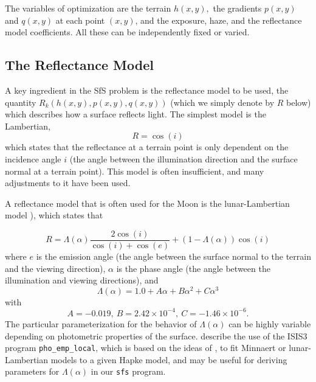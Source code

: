 \documentclass[draft,linenumbers]{agujournal}
\begin{document}
The variables of optimization are the terrain $h(x, y),$ the gradients 
$p(x, y)$ and $q(x, y)$ at each point
$(x, y)$, and the exposure, haze, and the reflectance model coefficients. 
All these can be independently fixed or varied. 

\subsection{The Reflectance Model}
\label{reflectance}

A key ingredient in the SfS problem is the reflectance model to be used, 
the quantity $R_k(h(x, y), p(x, y), q(x,y))$ (which we simply denote by $R$ below)
which describes
how a surface reflects light. The simplest model is the Lambertian,
\begin{equation}
R = \cos(i)
\end{equation}
which states that the reflectance at a terrain point is only dependent
on the incidence angle $i$ (the angle between the illumination
direction and the surface normal at a terrain point). This model is
often insufficient, and many adjustments to it have been used.

A reflectance model that is often used for the Moon is the lunar-Lambertian model
\citep{mcewen1996precise,lohse2006derivation}), which states that

\begin{equation}
R = \Lambda(\alpha) \frac{2\cos (i)}{\cos(i) + \cos(e)}
 + \left(1-\Lambda(\alpha)\right) \cos(i)
\end{equation}
where $e$ is the emission angle (the angle between the surface
normal to the terrain and the viewing direction), $\alpha$ is the phase
angle (the angle between the illumination and viewing directions), and
\begin{equation}
\Lambda(\alpha) = 1.0 + A\alpha + B\alpha^2 + C\alpha^3
\end{equation}
with
\begin{equation}
A = -0.019, \  B = 2.42\times 10^{-4}, \  C = -1.46 \times 10^{-6}.
\end{equation}
The particular parameterization for the behavior of $\Lambda(\alpha)$ can be highly
variable depending on photometric properties of the surface.  \citet{kirk2003photoclinometry}
describe the use of the ISIS3 program \texttt{pho\_emp\_local}, which is based on the ideas of \citet{mcewen1991photometric}, to
fit Minnaert or lunar-Lambertian models to a given Hapke model, and
may be useful for deriving parameters for $\Lambda(\alpha)$ in our
\texttt{sfs} program.
\end{document}
